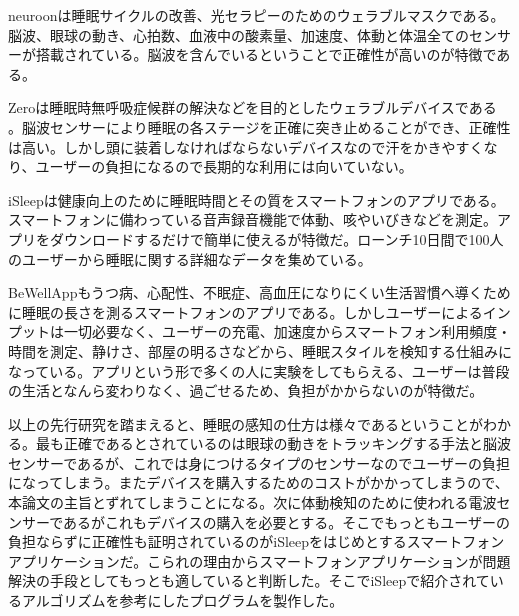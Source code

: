 neuroonは睡眠サイクルの改善、光セラピーのためのウェラブルマスクである。脳波、眼球の動き、心拍数、血液中の酸素量、加速度、体動と体温全てのセンサーが搭載されている\cite{neuroon}。脳波を含んでいるということで正確性が高いのが特徴である。

Zeroは睡眠時無呼吸症候群の解決などを目的としたウェラブルデバイスである \cite{beWellApp}。脳波センサーにより睡眠の各ステージを正確に突き止めることができ、正確性は高い。しかし頭に装着しなければならないデバイスなので汗をかきやすくなり、ユーザーの負担になるので長期的な利用には向いていない。

iSleepは健康向上のために睡眠時間とその質をスマートフォンのアプリである。スマートフォンに備わっている音声録音機能で体動、咳やいびきなどを測定\cite{iSleep}。アプリをダウンロードするだけで簡単に使えるが特徴だ。ローンチ10日間で100人のユーザーから睡眠に関する詳細なデータを集めている。

BeWellAppもうつ病、心配性、不眠症、高血圧になりにくい生活習慣へ導くために睡眠の長さを測るスマートフォンのアプリである。しかしユーザーによるインプットは一切必要なく、ユーザーの充電、加速度からスマートフォン利用頻度・時間を測定、静けさ、部屋の明るさなどから、睡眠スタイルを検知する仕組みになっている\cite{beWellApp}。アプリという形で多くの人に実験をしてもらえる、ユーザーは普段の生活となんら変わりなく、過ごせるため、負担がかからないのが特徴だ。

以上の先行研究を踏まえると、睡眠の感知の仕方は様々であるということがわかる。最も正確であるとされているのは眼球の動きをトラッキングする手法と脳波センサーであるが、これでは身につけるタイプのセンサーなのでユーザーの負担になってしまう。またデバイスを購入するためのコストがかかってしまうので、本論文の主旨とずれてしまうことになる。次に体動検知のために使われる電波センサーであるがこれもデバイスの購入を必要とする。そこでもっともユーザーの負担ならずに正確性も証明されているのがiSleepをはじめとするスマートフォンアプリケーションだ。こられの理由からスマートフォンアプリケーションが問題解決の手段としてもっとも適していると判断した。そこでiSleepで紹介されているアルゴリズムを参考にしたプログラムを製作した。

